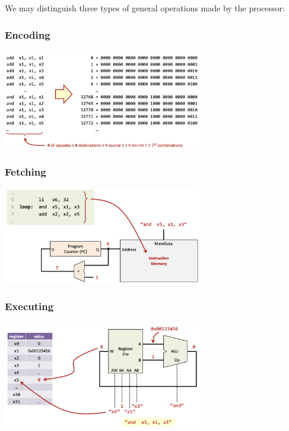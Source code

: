 We may distinguish three types of general operations made by the processor: \newline
\subsubsection*{Encoding}
\begin{center}
    \includegraphics[width=0.65\textwidth]{chapters/chapter1/images/encoding.png}
\end{center}
\subsubsection*{Fetching}
\begin{center}
    \includegraphics[width=0.65\textwidth]{chapters/chapter1/images/fetching.png}
\end{center}
\subsubsection*{Executing}
\begin{center}
    \includegraphics[width=0.65\textwidth]{chapters/chapter1/images/executing.png}
\end{center}



